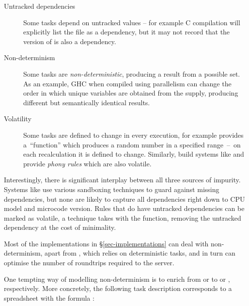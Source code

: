 \begin{description}
\item[Untracked dependencies] Some tasks depend on untracked values -- for example
C compilation will explicitly list the  file as a dependency,
but it may not record that the version of  is also a dependency.

\item[Non-determinism] Some tasks are \emph{non-deterministic}, producing a
result from a possible set. As an example, GHC when compiled using parallelism
can change the order in which unique variables are obtained from the supply,
producing different but semantically identical results.

\item[Volatility] Some tasks are defined to change in every execution, for
example \Excel provides a~``function''  which produces a random
number in a specified range~--~on each recalculation it is defined to change.
Similarly, build systems like \Make and \Shake provide \emph{phony rules} which
are also volatile.
\end{description}

Interestingly, there is significant interplay between all three sources of
impurity. Systems like \Bazel use various sandboxing techniques to guard against
missing dependencies, but none are likely to capture all dependencies right down
to CPU model and microcode version. Rules that do have untracked dependencies can be
marked as volatile, a technique \Excel takes with the  function,
removing the untracked dependency at the cost of minimality.

Most of the implementations in \S\ref{sec-implementations} can deal with
non-determinism, apart from \Buck, which relies on deterministic tasks, and
in turn can optimise the number of roundtrips required to the server.

One tempting way of modelling non-determinism is to enrich  from
 or  to  or ,
respectively. More concretely, the following task description corresponds to
a spreadsheet with the formula :

